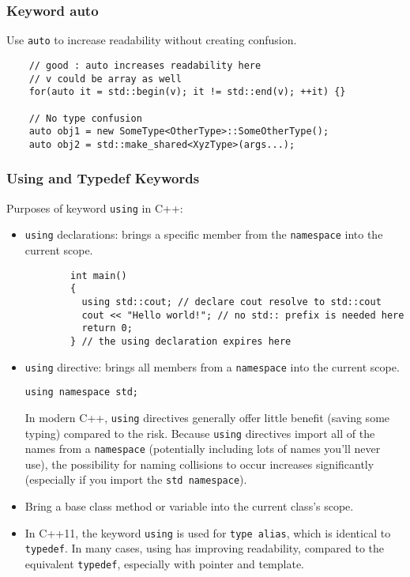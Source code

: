\subsubsection{Keyword auto}

Use \verb|auto| to increase readability without creating confusion.
\begin{verbatim}
	// good : auto increases readability here
	// v could be array as well
	for(auto it = std::begin(v); it != std::end(v); ++it) {}
	
	// No type confusion
	auto obj1 = new SomeType<OtherType>::SomeOtherType();
	auto obj2 = std::make_shared<XyzType>(args...);
\end{verbatim}

\subsubsection{Using and Typedef Keywords}

Purposes of keyword \verb|using| in C++:

\begin{itemize}
	\setlength\itemsep{0em}
	\item \verb|using| declarations: brings a specific member from the \verb|namespace| into the current scope.
	\begin{verbatim}
		int main()
		{
		  using std::cout; // declare cout resolve to std::cout
		  cout << "Hello world!"; // no std:: prefix is needed here
		  return 0;
		} // the using declaration expires here
	\end{verbatim}
	\item \verb|using| directive: brings all members from a \verb|namespace| into the current scope.
	
	\verb|using namespace std;|
	
	In modern C++, \verb|using| directives generally offer little benefit (saving some typing) compared to the risk. Because \verb|using| directives import all of the names from a \verb|namespace| (potentially including lots of names you’ll never use), the possibility for naming collisions to occur increases significantly (especially if you import the \verb|std namespace|).
	\item Bring a base class method or variable into the current class’s scope.
	\item In C++11, the keyword \verb|using| is used for \verb|type alias|, which is identical to \verb|typedef|. In many cases, using has improving readability, compared to the equivalent \verb|typedef|, especially with pointer and template.
\end{itemize}

